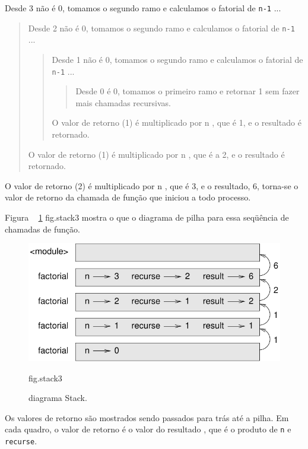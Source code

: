\documentclass[10pt]{book}
\begin{document}
{{{Desde 3 não é 0, tomamos o segundo ramo e calculamos o fatorial
de {\tt n-1} ...

\begin{quote}
Desde 2 não é 0, tomamos o segundo ramo e calculamos o fatorial de
{\tt n-1} ...


  \begin{quote}
  Desde 1 não é 0, tomamos o segundo ramo e calculamos o fatorial
  de {\tt n-1} ...


    \begin{quote}
    Desde 0 {\em} é 0, tomamos o primeiro ramo e retornar 1
    sem fazer mais chamadas recursivas.
    \end{quote}


  O valor de retorno (1) é multiplicado por n $ $, que é 1, e o
  resultado é retornado.
  \end{quote}


O valor de retorno (1) é multiplicado por n $ $, que é a 2, e o
resultado é retornado.
\end{quote}


O valor de retorno (2) é multiplicado por n $ $, que é 3, e o resultado, 6,
torna-se o valor de retorno da chamada de função que iniciou a todo
processo.

Figura ~ \ref {} fig.stack3 mostra o que o diagrama de pilha para
essa seqüência de chamadas de função.

\begin{figure}
\centerline
{\includegraphics[scale = 0.8] {figs/stack3.pdf}}
\caption{diagrama Stack.}
\label{} fig.stack3
\end{figure}

Os valores de retorno são mostrados sendo passados ​​para trás até a pilha. Em cada
quadro, o valor de retorno é o valor do resultado {\tt}, que é o
produto de {\tt n} e {\tt recurse}.

}}}
\end{document}
